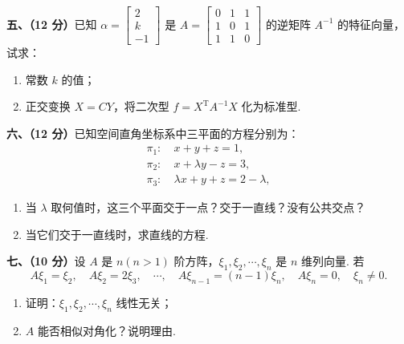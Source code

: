 \documentclass[a4paper,11pt]{ctexart}
\newcommand{\T}{\mathrm{T}}
\begin{document}
\textbf{五、（12 分）}已知 $\alpha = \begin{bmatrix} 2 \\ k \\ -1 \end{bmatrix}$ 是 $A = \begin{bmatrix} 0 & 1 & 1 \\ 1 & 0 & 1 \\ 1 & 1 & 0 \end{bmatrix}$ 的逆矩阵 $A^{-1}$ 的特征向量，试求：
\begin{enumerate}[label=(\arabic*), leftmargin=2.4em, itemsep=0.25em, topsep=0.3em]
  \item 常数 $k$ 的值；
  \item 正交变换 $X = CY$，将二次型 $f = X^{\T} A^{-1} X$ 化为标准型.
\end{enumerate}

\vspace{0.8em}

\textbf{六、（12 分）}已知空间直角坐标系中三平面的方程分别为：
\begin{align*}
  \pi_1:\ & x + y + z = 1, \\
  \pi_2:\ & x + \lambda y - z = 3, \\
  \pi_3:\ & \lambda x + y + z = 2 - \lambda,
\end{align*}
\begin{enumerate}[label=(\arabic*), leftmargin=2.4em, itemsep=0.25em, topsep=0.3em]
  \item 当 $\lambda$ 取何值时，这三个平面交于一点？交于一直线？没有公共交点？
  \item 当它们交于一直线时，求直线的方程.
\end{enumerate}

\vspace{0.8em}

\textbf{七、（10 分）}设 $A$ 是 $n(n > 1)$ 阶方阵，$\xi_1, \xi_2, \cdots, \xi_n$ 是 $n$ 维列向量. 若
\[
  A\xi_1 = \xi_2,\quad A\xi_2 = 2\xi_3,\quad \cdots,\quad A\xi_{n-1} = (n-1)\xi_n,\quad A\xi_n = 0,\quad \xi_n \neq 0.
\]
\begin{enumerate}[label=(\arabic*), leftmargin=2.4em, itemsep=0.25em, topsep=0.3em]
  \item 证明：$\xi_1, \xi_2, \cdots, \xi_n$ 线性无关；
  \item $A$ 能否相似对角化？说明理由.
\end{enumerate}

\vspace{0.8em}
\end{document}
